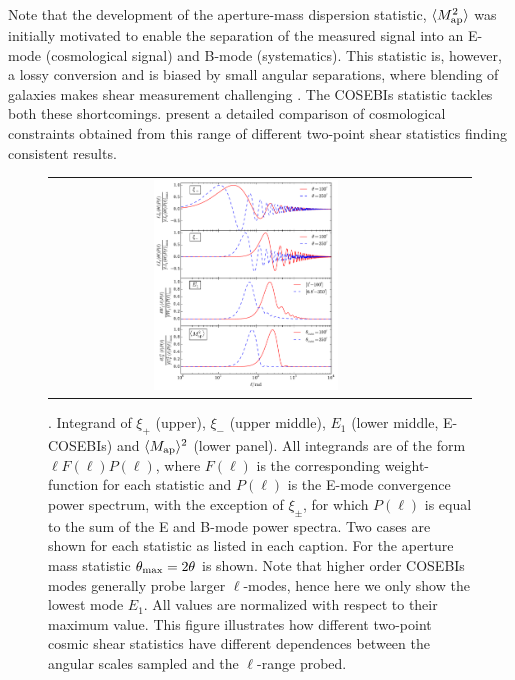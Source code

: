 Note that the development of the aperture-mass dispersion statistic, $\langle
M_ {\rm ap}^2 \rangle$ was initially motivated to enable the separation of the
measured signal into an E-mode (cosmological signal) and B-mode (systematics).
This statistic is, however, a lossy conversion and is biased by small angular
separations, where blending of galaxies makes shear measurement challenging
\citep{KSE06}. The COSEBIs statistic tackles both these shortcomings.
\citet{CFHTLenS-2pt-notomo} present a detailed comparison of cosmological
constraints obtained from this range of different two-point shear statistics
finding consistent results.

\begin{figure}%
\begin{center}
\begin{tabular}{ccc}
\includegraphics[width=0.48\textwidth]{figures/IntegAll.pdf} \\
\end{tabular}
\caption{ \small{\label{fig:filters}. 
Integrand of $\xi_+$ (upper), $\xi_-$
(upper middle), $E_1$ (lower middle, E-COSEBIs) and $\langle M_{\rm ap}
\rangle^2$ (lower panel). All integrands are of the form $\ell F(\ell)
P(\ell)$, where $F(\ell)$ is the corresponding weight-function for each
statistic and $P(\ell)$ is the E-mode convergence power spectrum, with the
exception of $\xi_\pm$, for which $P(\ell)$ is equal to the sum of the E and
B-mode power spectra. Two cases are shown for each statistic as listed in each
caption. For the aperture mass statistic $\theta_{\rm max}=2\theta$ is shown.
Note that higher order COSEBIs modes generally probe larger $\ell$-modes, hence
here we only show the lowest mode $E_1$. All values are normalized with respect
to their maximum value. This figure illustrates how different two-point cosmic shear
statistics have different dependences between the angular scales sampled and the $\ell$-range probed. }}
\end{center}
\end{figure}

